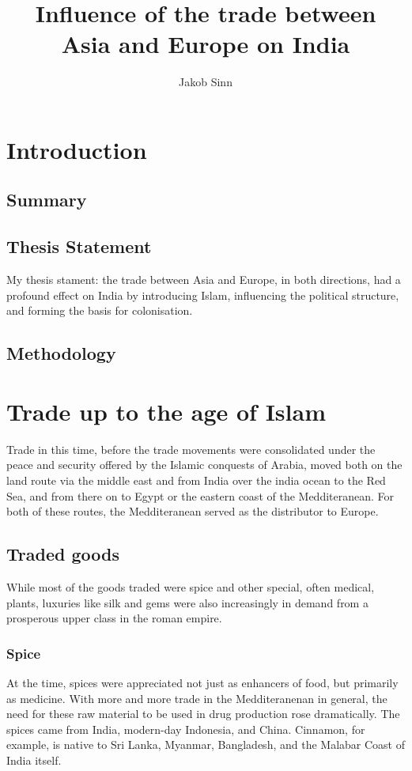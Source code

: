 \documentclass[11pt, a4paper]{scrreprt}
\begin{document}
\renewcommand{\baselinestretch}{1.5}
\subject{Facharbeit}
\author{Jakob Sinn}
\title{Influence of the trade between \\ Asia and Europe on India}
\maketitle
\tableofcontents
{}
\chapter{Introduction}
\section{Summary}

\section{Thesis Statement}
My thesis stament: the trade between Asia and Europe, in both directions, had a profound effect on India by introducing Islam, influencing the political structure, and forming the basis for colonisation.
\section{Methodology}
 
\chapter{Trade up to the age of Islam}
Trade in this time, before the trade movements were consolidated under the peace and security offered by the Islamic conquests of Arabia, moved both on the land route via the middle east and from India over the india ocean to the Red Sea, and from there on to Egypt or the eastern coast of the Medditeranean. For both of these routes, the Medditeranean served as the distributor to Europe.

\section{Traded goods}
While most of the goods traded were spice and other special, often medical, plants, luxuries like silk and gems were also increasingly in demand from a prosperous upper class in the roman empire.
\subsection{Spice}
At the time, spices were appreciated not just as enhancers of food, but primarily as medicine\autocite{MST}. With more and more trade in the Medditeranenan in general, the need for these raw material to be used in drug production rose dramatically.
The spices came from India, modern-day Indonesia, and China. Cinnamon, for example, is native to Sri Lanka, Myanmar, Bangladesh, and the Malabar Coast of India itself\autocite{Cinnamon}.
\end{document}
